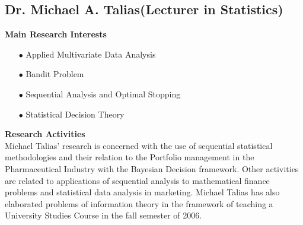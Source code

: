 \subsection[Dr. Michael A. Talias] {Dr. Michael A. Talias{\normalfont\normalsize\newline (Lecturer in Statistics)}}

\vspace{0.3cm}
\textbf{Main Research Interests}\\[-0.25cm]
\begin{enumerate}
\item[$\bullet$]	Applied Multivariate Data Analysis
\item[$\bullet$]	Bandit Problem
\item[$\bullet$]	Sequential Analysis and Optimal Stopping
\item[$\bullet$]	Statistical Decision Theory
\end{enumerate}


\vspace{0.6cm}
\textbf{Research Activities}\\[-0.25 cm]

Michael Talias' research is concerned with the use of sequential statistical methodologies and their relation to the Portfolio management in the Pharmaceutical Industry with the Bayesian Decision framework. Other activities are related to applications of sequential analysis to mathematical finance problems and statistical data analysis in marketing. Michael Talias has also elaborated problems of information theory in the framework of teaching a University Studies Course in the fall semester of 2006.
